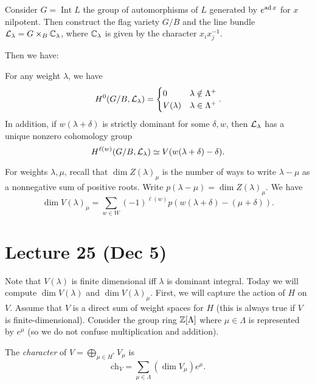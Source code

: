 \documentclass[twoside, 10pt]{article}
\begin{document}
    Consider $G = \operatorname{Int} L$ the group of automorphisms of $L$ generated by $e^{\operatorname{ad} x}$ for $x$ nilpotent. Then construct the flag variety $G/B$ and the line bundle $\mathcal{L}_{\lambda} = G \times_B \mathbb{C}_{\lambda}$, where $\mathbb{C}_{\lambda}$ is given by the character $x_ix_j^{-1}$.

    Then we have:
    \begin{thm}
        For any weight $\lambda$, we have 
        \[H^0(G/B, \mathcal{L}_{\lambda}) = \begin{cases}
            0 & \lambda \notin \Lambda^+ \\
            V(\lambda) & \lambda \in \Lambda^+
        \end{cases}.\] 
        In addition, if $w(\lambda + \delta)$ is strictly dominant for some $\delta, w$, then $\mathcal{L}_{\lambda}$ has a unique nonzero cohomology group 
        \[H^{\ell(w)}(G/B, \mathcal{L}_{\lambda}) \simeq V(w(\lambda+\delta) - \delta). \]
    \end{thm}

    \begin{thm}
        For weights $\lambda, \mu$, recall that $\dim Z(\lambda)_{\mu}$ is the number of ways to write $\lambda - \mu$ as a nonnegative sum of positive roots. Write $p(\lambda - \mu) = \dim Z(\lambda)_{\mu}$. We have
        \[ \dim V(\lambda)_{\mu} = \sum_{w \in W} (-1)^{\ell(w)} p(w(\lambda + \delta) - (\mu + \delta)). \]
    \end{thm}

    \section{Lecture 25 (Dec 5)}%
    \label{sec:lecture_25_dec_5_}
    
    Note that $V(\lambda)$ is finite dimensional iff $\lambda$ is dominant integral. Today we will compute $\dim V(\lambda)$ and $\dim V(\lambda)_{\mu}$. First, we will capture the action of $H$ on $V$. Assume that $V$ is a direct sum of weight spaces for $H$ (this is always true if $V$ is finite-dimensional). Consider the group ring $\mathbb{Z}[\Lambda]$ where $\mu \in \Lambda$ is represented by $e^{\mu}$ (so we do not confuse multiplication and addition).

    \begin{defn}
        The \textit{character} of $V = \bigoplus_{\mu \in H^*} V_{\mu}$ is
        \[ \mathrm{ch}_V = \sum_{\mu \in \Lambda} (\dim V_{\mu}) e^{\mu}. \]
    \end{defn}
\end{document}
